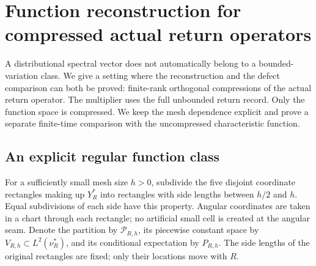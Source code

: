 \section{Function reconstruction for compressed actual return operators}
\label{sec:compressed-return-resolvents}
A distributional spectral vector does not automatically belong to a
bounded-variation class. We give a setting where the reconstruction
and the defect comparison can both be proved: finite-rank orthogonal
compressions of the actual return operator. The multiplier uses the
full unbounded return record. Only the function space is compressed.
We keep the mesh dependence explicit and prove a separate finite-time
comparison with the uncompressed characteristic function.

\subsection{An explicit regular function class}
For a sufficiently small mesh size $h>0$, subdivide the five disjoint
coordinate rectangles making up $Y_R^*$ into rectangles with side
lengths between $h/2$ and $h$. Equal subdivisions of each side have
this property. Angular coordinates are taken in a chart through each
rectangle; no artificial small cell is created at the angular seam.
Denote the partition by $\mathcal P_{R,h}$, its piecewise constant
space by $V_{R,h}\subset L^2(\nu_R^*)$, and its conditional expectation
by $P_{R,h}$. The side lengths of the original rectangles are fixed;
only their locations move with $R$.


